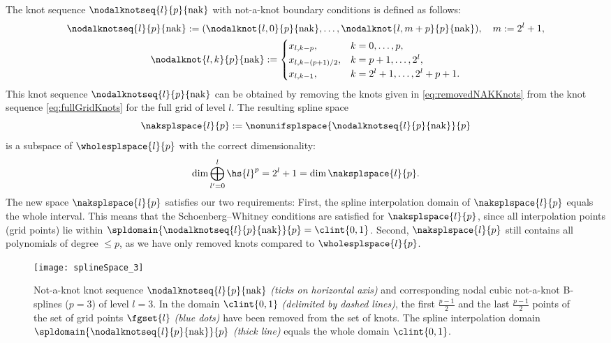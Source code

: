 The knot sequence $\nodalknotseq{l}{p}{\notaknot}$
with not-a-knot boundary conditions is defined as follows:
\begin{subequations}
  \begin{gather}
    \nodalknotseq{l}{p}{\notaknot}
    := (\nodalknot{l,0}{p}{\notaknot}, \dotsc,
    \nodalknot{l,m+p}{p}{\notaknot}),\quad
    m := 2^l + 1,\\
    \nodalknot{l,k}{p}{\notaknot}
    :=
    \begin{cases}
      \gp{l,k-p},&
      k = 0, \dotsc, p,\\
      \gp{l,k-(p+1)/2},&
      k = p + 1, \dotsc, 2^l,\\
      \gp{l,k-1},&
      k = 2^l + 1, \dotsc, 2^l + p + 1.
    \end{cases}
  \end{gather}
\end{subequations}
This knot sequence $\nodalknotseq{l}{p}{\notaknot}$
can be obtained by removing the knots
given in \eqref{eq:removedNAKKnots} from the
knot sequence \eqref{eq:fullGridKnots} for the full grid of level $l$.
The resulting spline space
\begin{equation}
  \naksplspace{l}{p}
  := \nonunifsplspace{\nodalknotseq{l}{p}{\notaknot}}{p}
\end{equation}
is a subspace
of $\wholesplspace{l}{p}$ with the correct dimensionality:
\begin{equation}
  \dim \bigoplus_{l'=0}^l \hs{l}^p
  = 2^l + 1
  = \dim \naksplspace{l}{p}.
\end{equation}
The new space $\naksplspace{l}{p}$ satisfies our two requirements:
First, the spline interpolation domain of $\naksplspace{l}{p}$
equals the whole interval.
This means that the Schoenberg--Whitney conditions are satisfied
for $\naksplspace{l}{p}$, since all interpolation points
(grid points) lie within
$\spldomain{\nodalknotseq{l}{p}{\notaknot}}{p} = \clint{0, 1}$.
Second, $\naksplspace{l}{p}$ still contains all polynomials of
degree $\le p$, as we have only removed knots compared to
$\wholesplspace{l}{p}$.

\begin{figure}
  \texttt{[image: splineSpace\_3]}%
  \caption{%
    Not-a-knot knot sequence $\nodalknotseq{l}{p}{\notaknot}$
    \emph{(ticks on horizontal axis)}
    and corresponding nodal cubic not-a-knot B-splines ($p = 3$)
    of level $l = 3$.
    In the domain $\clint{0, 1}$ \emph{(delimited by dashed lines)},
    the first $\tfrac{p-1}{2}$ and the last $\tfrac{p-1}{2}$ points
    of the set of grid points $\fgset{l}$
    \emph{\textcolor{mittelblau}{(blue dots)}}
    have been removed from the set of knots.
    The spline interpolation domain
    $\spldomain{\nodalknotseq{l}{p}{\notaknot}}{p}$
    \emph{(thick line)}
    equals the whole domain $\clint{0, 1}$.%
  }%
  \label{fig:splineSpaceNotAKnot}%
\end{figure}

